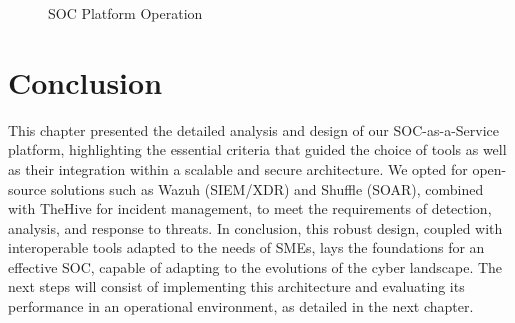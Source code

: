 \begin{figure}[H]
\centering
{}
\caption{SOC Platform Operation}
\label{fig:soc-operation}
\end{figure}

\section{Conclusion}
\label{sec:conclusion}

This chapter presented the detailed analysis and design of our SOC-as-a-Service platform, highlighting the essential criteria that guided the choice of tools as well as their integration within a scalable and secure architecture. We opted for open-source solutions such as Wazuh (SIEM/XDR) and Shuffle (SOAR), combined with TheHive for incident management, to meet the requirements of detection, analysis, and response to threats. In conclusion, this robust design, coupled with interoperable tools adapted to the needs of SMEs, lays the foundations for an effective SOC, capable of adapting to the evolutions of the cyber landscape. The next steps will consist of implementing this architecture and evaluating its performance in an operational environment, as detailed in the next chapter.

